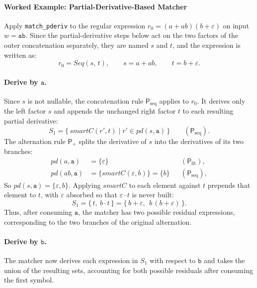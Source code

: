 %
%
%

\clearpage
\paragraph{Worked Example: Partial-Derivative-Based Matcher}
\label{sec:pderiv-worked-example}

Apply \texttt{match\_pderiv} to the regular expression
$r_0 = (a + ab)(b + \varepsilon)$
on input $w = \mathtt{ab}$.
Since the partial-derivative steps below act on the two factors
of the outer concatenation separately,
they are named $s$ and $t$, and the expression is written as:
\[
r_0 = \mathit{Seq}(s,\, t),
\qquad
s = a + ab,
\qquad
t = b + \varepsilon.
\]

%

\paragraph{Derive by $\mathtt{a}$.}
Since $s$ is not nullable, the concatenation rule
$\mathsf{P}_{\mathrm{seq}}$ applies to $r_0$.
It derives only the left factor $s$ and appends the unchanged
right factor $t$ to each resulting partial derivative:
\[
S_1 = \{\, \mathit{smartC}(r',t) \mid r' \in pd(s,\mathtt{a}) \,\}
  \qquad (\mathsf{P}_{\mathrm{seq}}).
\]
The alternation rule $\mathsf{P}_{+}$ splits the derivative
of $s$ into the derivatives of its two branches:
\[
\begin{aligned}
pd(a,\mathtt{a}) &= \{\varepsilon\}
  &&(\mathsf{P}_{\mathrm{lit}}), \\[2pt]
pd(ab,\mathtt{a}) &= \{\mathit{smartC}(\varepsilon,b)\} = \{b\}
  &&(\mathsf{P}_{\mathrm{seq}}),
\end{aligned}
\]
So $pd(s,\mathtt{a}) = \{\varepsilon, b\}$. Applying $\mathit{smartC}$
to each element against $t$ prepends that element to $t$, with
$\varepsilon$ absorbed so that $\varepsilon \cdot t$ is never built:
\[
S_1 = \{\, t,\ b\cdot t \,\} = \{\, b+\varepsilon,\ \ b\,(b+\varepsilon) \,\}.
\]
Thus, after consuming $\mathtt{a}$, 
the matcher has two possible residual expressions, 
corresponding to the two branches of the original alternation.

%

\paragraph{Derive by $\mathtt{b}$.}
The matcher now derives each expression in $S_1$ with respect
to $\mathtt{b}$ and takes the union of the resulting sets,
accounting for both possible residuals after consuming the first symbol.

